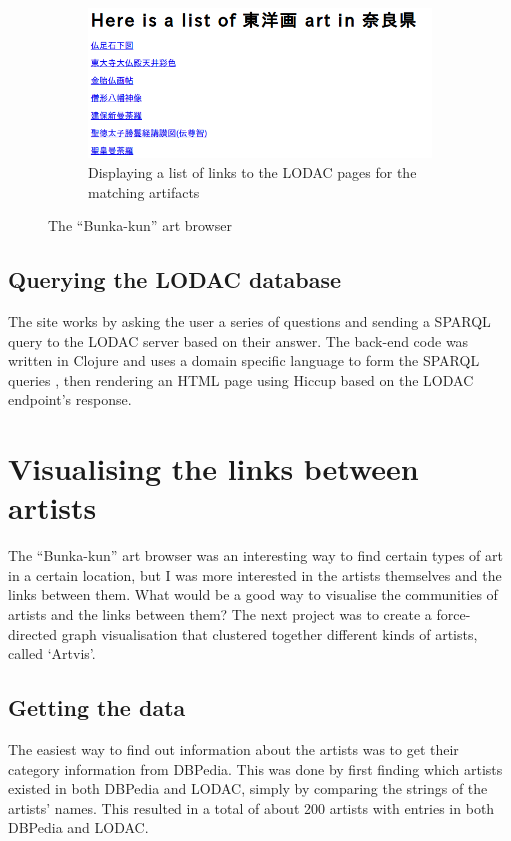 \documentclass[11pt]{article}
\begin{document}
\begin{figure}
  \vspace{10mm}
  \begin{subfigure}[b]{0.5\textwidth}
    \includegraphics[width=\textwidth]{bunka3.png}
    \caption{Displaying a list of links to the LODAC pages for the matching artifacts}
    \label{fig:bunka3} 
  \end{subfigure}
\caption{The ``Bunka-kun'' art browser}
\label{fig:bunka} 
\end{figure}

\subsection{Querying the LODAC database} The site works by asking the user a series of questions and sending a SPARQL query to the LODAC server based on their answer.  The back-end code was written in Clojure \cite{clojure} and uses a domain specific language to form the SPARQL queries \cite{matz}, then rendering an HTML page using Hiccup \cite{hiccup} based on the LODAC endpoint's response.  

\section{Visualising the links between artists} The ``Bunka-kun'' art browser was an interesting way to find certain types of art in a certain location, but I was more interested in the artists themselves and the links between them. What would be a good way to visualise the communities of artists and the links between them? The next project was to create a force-directed graph visualisation that clustered together different kinds of artists, called `Artvis'.  

\subsection{Getting the data} The easiest way to find out information about the artists was to get their category information from DBPedia. This was done by first finding which artists existed in both DBPedia and LODAC, simply by comparing the strings of the artists' names. This resulted in a total of about 200 artists with entries in both DBPedia and LODAC. 
\end{document}

